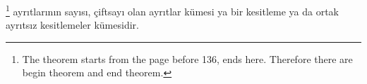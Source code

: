 \documentclass[11pt]{amsbook}
\begin{document}
\begin{theorem}\footnote{The theorem starts from the page before 136, ends here. Therefore there are begin theorem and end theorem.}
   ayrıtlarının sayısı, çiftsayı olan ayrıtlar kümesi ya bir kesitleme ya da ortak ayrıtsız kesitlemeler kümesidir. 
  
\end{theorem}
\end{document}
